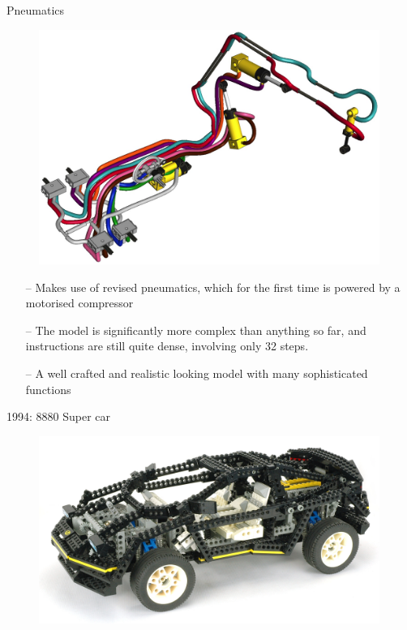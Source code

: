 \documentclass[xcolor=dvipsnames]{beamer}
\begin{document}
\begin{frame}[fragile]{Pneumatics}
\begin{figure}[H]
 \centering
 \includegraphics[width=0.99\textwidth]{1992_8868_truck_pneumatics_2.jpg}
\end{figure}
\end{frame}

\begin{frame}[fragile]{}
\begin{itemize}
\item[--] Makes use of revised pneumatics, which for the first time is powered by a motorised compressor  \vspace{3mm}
\item[--] The model is significantly more complex than anything so far, and instructions are still quite dense, involving only 32 steps. \vspace{3mm}
\item[--] A well crafted and realistic looking model with many sophisticated functions \vspace{3mm}
\end{itemize}
\end{frame}

\begin{frame}[fragile]{1994: 8880 Super car}
\begin{figure}[H]
 \centering
 \includegraphics[width=0.99\textwidth]{1994_8880_car.jpg}
\end{figure}
\end{frame}
\end{document}
